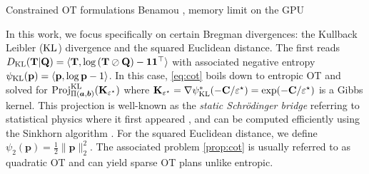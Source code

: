 \begin{remark}
    Constrained OT formulations Benamou , memory limit on the GPU 
\end{remark}


In this work, we focus specifically on 
certain Bregman divergences: the Kullback Leibler ($\operatorname{KL}$) divergence and the squared Euclidean distance.
The first reads $D_{\operatorname{KL}}({\mathbf{T}} | {\mathbf{Q}}) = \langle {\mathbf{T}}, \log \left({\mathbf{T}} \oslash {\mathbf{Q}} \right) - \bm{1} \bm{1}^\top \rangle$ with associated negative entropy $\psi_{\operatorname{KL}}(\mathbf{p}) = \langle \mathbf{p}, \log \mathbf{p} - 1 \rangle$. In this case, \eqref{eq:cot} boils down to entropic OT and solved for $\operatorname{Proj}^{\operatorname{KL}}_{\Pi(\bm{a}, \bm{b})}({\mathbf{K}}_{\varepsilon^\star})$ where ${\mathbf{K}}_{\varepsilon^\star} = \nabla \psi_{\operatorname{KL}}^{*}(-{\mathbf{C}} / \varepsilon^\star) = \exp(-{\mathbf{C}} / \varepsilon^\star)$ is a Gibbs kernel. This projection is well-known as the \emph{static Schrödinger bridge} \citep{leonard2013survey} referring to statistical physics where it first appeared \citep{schrodinger1931umkehrung}, and can be computed efficiently using the Sinkhorn algorithm \citep{cuturi2013sinkhorn}. For the squared Euclidean distance, we define $\psi_{2}(\mathbf{p}) = \frac{1}{2} \| \mathbf{p} \|^2_2$. The associated problem \eqref{prop:cot} is usually referred to as quadratic OT \citep{lorenz2021quadratically} and can yield sparse OT plans unlike entropic.

